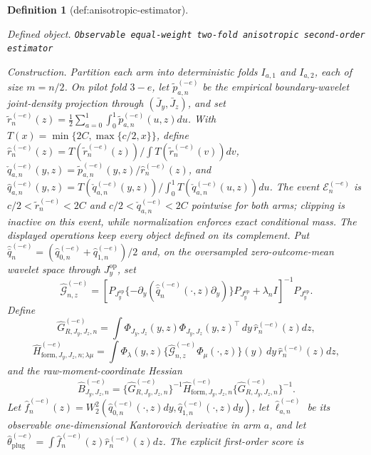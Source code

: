 \documentclass{article}
\newtheorem{definition}{Definition}
\begin{document}
\begin{definition}[def:anisotropic-estimator]\label{def:anisotropic-estimator}
\par\smallskip\noindent\emph{Defined object.} \texttt{Observable equal-\allowbreak{}weight two-\allowbreak{}fold anisotropic second-\allowbreak{}order estimator}
\par\smallskip\noindent\emph{Construction.} Partition each arm into deterministic folds \(I_{a,1}\) and \(I_{a,2}\), each of size \(m=n/2\). On pilot fold \(3-e\), let \(\widetilde p_{a,n}^{(-e)}\) be the empirical boundary-wavelet joint-density projection through \((\bar J_y,\bar J_z)\), and set \(\widetilde r_n^{(-e)}(z)=\frac12\sum_{a=0}^1\int_0^1\widetilde p_{a,n}^{(-e)}(u,z)du\). With \(T(x)=\min\{2C,\max\{c/2,x\}\}\), define \(\widehat r_n^{(-e)}(z)=T(\widetilde r_n^{(-e)}(z))/\int T(\widetilde r_n^{(-e)}(v))dv\), \(\check q_{a,n}^{(-e)}(y,z)=\widetilde p_{a,n}^{(-e)}(y,z)/\widehat r_n^{(-e)}(z)\), and \(\widehat q_{a,n}^{(-e)}(y,z)=T(\check q_{a,n}^{(-e)}(y,z))/\int_0^1T(\check q_{a,n}^{(-e)}(u,z))du\). The event \(\mathcal E_n^{(-e)}\) is \(c/2<\widetilde r_n^{(-e)}<2C\) and \(c/2<\check q_{a,n}^{(-e)}<2C\) pointwise for both arms; clipping is inactive on this event, while normalization enforces exact conditional mass. The displayed operations keep every object defined on its complement. Put \(\widehat{\bar q}_n^{(-e)}=(\widehat q_{0,n}^{(-e)}+\widehat q_{1,n}^{(-e)})/2\) and, on the oversampled zero-outcome-mean wavelet space through \(J_y^{\mathrm{op}}\), set
\[
\widehat{\mathcal G}_{n,z}^{(-e)}=
\left[P_{J_y^{\mathrm{op}}}\{-\partial_y(\widehat{\bar q}_n^{(-e)}(\cdot,z)\partial_y)\}P_{J_y^{\mathrm{op}}}+\lambda_n I\right]^{-1}P_{J_y^{\mathrm{op}}}.
\]
Define
\[
\widehat G_{R,J_y,J_z,n}^{(-e)}
=\int\Phi_{J_y,J_z}(y,z)\Phi_{J_y,J_z}(y,z)^{\top}\,dy\,\widehat r_n^{(-e)}(z)dz,
\]
\[
\widehat H_{\mathrm{form},J_y,J_z,n;\lambda\mu}^{(-e)}
=\int\Phi_\lambda(y,z)\{\widehat{\mathcal G}_{n,z}^{(-e)}\Phi_\mu(\cdot,z)\}(y)\,dy\,\widehat r_n^{(-e)}(z)dz,
\]
and the raw-moment-coordinate Hessian
\[
\widehat B_{J_y,J_z,n}^{(-e)}
=\{\widehat G_{R,J_y,J_z,n}^{(-e)}\}^{-1}
\widehat H_{\mathrm{form},J_y,J_z,n}^{(-e)}
\{\widehat G_{R,J_y,J_z,n}^{(-e)}\}^{-1}.
\]
Let \(\widehat f_n^{(-e)}(z)=W_2^2(\widehat q_{0,n}^{(-e)}(\cdot,z)dy,\widehat q_{1,n}^{(-e)}(\cdot,z)dy)\), let \(\widehat\ell_{a,n}^{(-e)}\) be its observable one-dimensional Kantorovich derivative in arm \(a\), and let \(\widehat\theta_{\mathrm{plug}}^{(-e)}=\int\widehat f_n^{(-e)}(z)\widehat r_n^{(-e)}(z)dz\). The explicit first-order score is
\[
\]
\end{definition}
\end{document}
